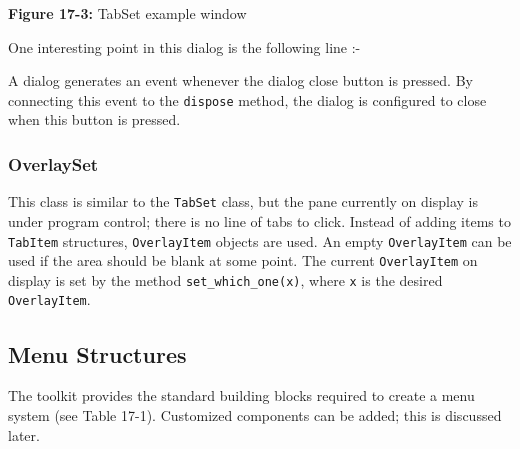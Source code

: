 {\sffamily\bfseries Figure 17-3:}
{\sffamily TabSet example window}

\bigskip

One interesting point in this dialog is the following line :-



A dialog generates an event whenever the dialog close button is
pressed. By connecting this event to the \texttt{dispose}
method, the dialog is configured to close when this button is
pressed.

\subsubsection[OverlaySet]{OverlaySet}

This class is similar to the
\texttt{TabSet} class, but the pane currently on
display is under program control; there is no line of tabs to click.
Instead of adding items to \texttt{TabItem} structures,
\texttt{OverlayItem} objects are used. An empty \texttt{OverlayItem}
can be used if the area should be blank at some point. The current
\texttt{OverlayItem} on display is set by the method
\texttt{set\_which\_one(x)}, where \texttt{x} is the desired
\texttt{OverlayItem}.

\subsection{Menu Structures}

The toolkit provides the standard building blocks required to create
a menu system (see Table 17-1). Customized components can
be added; this is discussed later.

\bigskip

